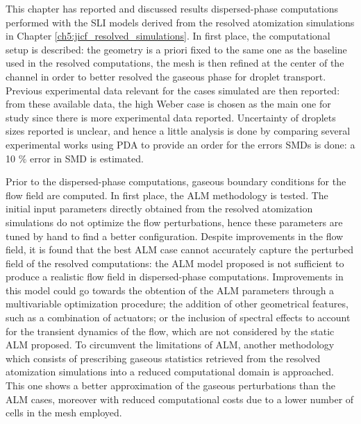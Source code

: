 This chapter has reported and discussed results dispersed-phase computations performed with the SLI models derived from the resolved atomization simulations in Chapter \ref{ch5:jicf_resolved_simulations}. In first place, the computational setup is described: the geometry is a priori fixed to the same one as the baseline used in the resolved computations, the mesh is then refined at the center of the channel in order to better resolved the gaseous phase for droplet transport. Previous experimental data relevant for the cases simulated are then reported: from these available data, the high Weber case is chosen as the main one for study since there is more experimental data reported. Uncertainty of droplets sizes reported is unclear, and hence a little analysis is done by comparing several experimental works using PDA to provide an order for the errors SMDs is done: a 10 $\%$ error in SMD is estimated. 

Prior to the dispersed-phase computations, gaseous boundary conditions for the flow field are computed. In first place, the ALM methodology is tested. The initial input parameters directly obtained from the resolved atomization simulations do not optimize the flow perturbations, hence these parameters are tuned by hand to find a better configuration. Despite improvements in the flow field, it is found that the best ALM case cannot accurately capture the perturbed field of the resolved computations: the ALM model proposed is not sufficient to produce a realistic flow field in dispersed-phase computations. Improvements in this model could go towards the obtention of the ALM parameters through a multivariable optimization procedure; the addition of other geometrical features, such as a combination of actuators; or the inclusion of spectral effects to account for the transient dynamics of the flow, which are not considered by the static ALM proposed. To circumvent the limitations of ALM, another methodology which consists of prescribing gaseous statistics retrieved from the resolved atomization simulations into a reduced computational domain is approached. This one shows a better approximation of the gaseous perturbations than the ALM cases, moreover with reduced computational costs due to a lower number of cells in the mesh employed.

